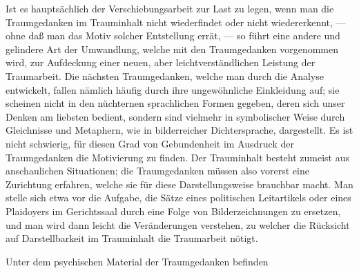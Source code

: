 \documentclass{article}
\begin{document}
            
        \pstart
        Ist es hauptsächlich der Verschiebungsarbeit zur Last zu legen, wenn man die
               Traumgedanken im Trauminhalt nicht wiederfindet oder nicht
               wiedererkennt, — ohne daß man das Motiv solcher Entstellung errät, — so führt
               eine andere und gelindere Art der Umwandlung, welche mit den Traumgedanken
                  vorgenommen wird, zur Aufdeckung einer neuen, aber leichtverständlichen Leistung der Traumarbeit. Die nächsten Traumgedanken, welche man durch die Analyse entwickelt, fallen nämlich
               häufig durch ihre ungewöhnliche Einkleidung auf; sie scheinen nicht in den
               nüchternen sprachlichen Formen gegeben, deren sich unser Denken am liebsten
               bedient, sondern sind vielmehr in symbolischer Weise durch
               Gleichnisse und Metaphern, wie in bilderreicher Dichtersprache, dargestellt. Es
               ist nicht schwierig, für diesen Grad von Gebundenheit im Ausdruck der
               Traumgedanken die Motivierung zu finden. Der Trauminhalt besteht zumeist aus
               anschaulichen Situationen; die Traumgedanken müssen also vorerst eine Zurichtung
               erfahren, welche sie für diese Darstellungsweise brauchbar macht. Man stelle
               sich etwa vor die Aufgabe, die Sätze eines politischen Leitartikels oder
               eines Plaidoyers im Gerichtssaal durch eine Folge von Bilderzeichnungen zu
               ersetzen, und man wird dann leicht die Veränderungen verstehen, zu
               welcher die Rücksicht auf Darstellbarkeit im
                  Trauminhalt die Traumarbeit nötigt.
        \pend
    
            
        \pstart
        Unter dem psychischen Material der Traumgedanken befinden
        \pend
    
         
            
            
            
\end{document}
